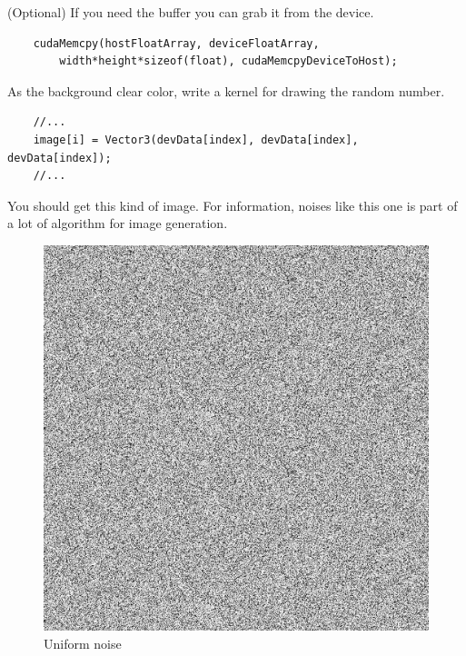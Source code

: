 \documentclass{article}
\begin{document}
(Optional) If you need the buffer you can grab it from the device.
\begin{lstlisting}
	cudaMemcpy(hostFloatArray, deviceFloatArray,
		width*height*sizeof(float), cudaMemcpyDeviceToHost);
\end{lstlisting}

As the background clear color, write a kernel for drawing the random number. 

\begin{lstlisting}
	//...
	image[i] = Vector3(devData[index], devData[index], devData[index]);
	//...
\end{lstlisting}

You should get this kind of image. For information, noises like this one is part of a lot of algorithm for image generation.
\begin{figure}[h]
	\centering
	\includegraphics[scale=0.47]{figures/random.png}
	\caption{Uniform noise}
\end{figure}


\newpage
\end{document}
